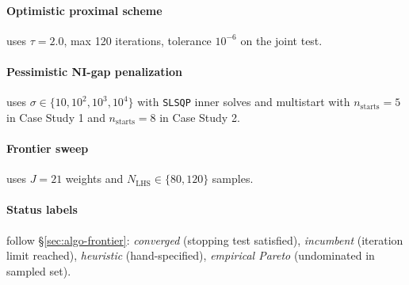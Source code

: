 \documentclass[11pt]{article}
\theoremstyle{definition}
\begin{document}
\paragraph{Optimistic proximal scheme} uses $\tau=2.0$, max 120
iterations, tolerance $10^{-6}$ on the joint test.

\paragraph{Pessimistic NI-gap penalization} uses
$\sigma\in\{10,10^2,10^3,10^4\}$ with \texttt{SLSQP} inner solves
and multistart with $n_\mathrm{starts}=5$ in Case Study 1 and
$n_\mathrm{starts}=8$ in Case Study 2.

\paragraph{Frontier sweep} uses $J=21$ weights and
$N_\mathrm{LHS}\in\{80,120\}$ samples.

\paragraph{Status labels} follow \S\ref{sec:algo-frontier}:
\emph{converged} (stopping test satisfied), \emph{incumbent}
(iteration limit reached), \emph{heuristic} (hand-specified),
\emph{empirical Pareto} (undominated in sampled set).



\end{document}
